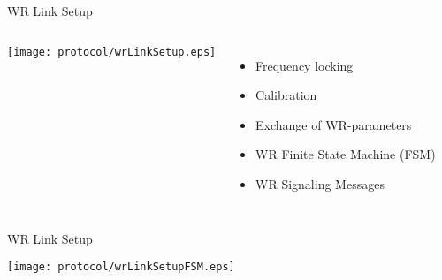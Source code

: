 \documentclass[compress,red]{beamer}
\begin{document}
\begin{frame}{WR Link Setup }

  \begin{columns}[c]

      \begin{center}
      \texttt{[image: protocol/wrLinkSetup.eps]}
      \end{center}



      \begin{itemize}
	\item Frequency locking
	\item Calibration
	\item Exchange of WR-parameters
	\item WR Finite State Machine (FSM)
	\item WR Signaling Messages
      \end{itemize}

  \end{columns}

\end{frame}
\begin{frame}{WR Link Setup}

      \begin{center}
      \texttt{[image: protocol/wrLinkSetupFSM.eps]}
      \end{center}

\end{frame}
\end{document}
